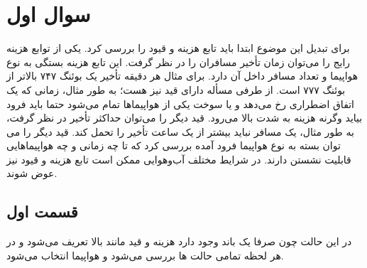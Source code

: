 \section{سوال اول}
برای تبدیل این موضوع ابتدا باید تابع هزینه و قیود را بررسی کرد. یکی از توابع هزینه رایج را می‌توان زمان تأخیر مسافران را در نظر گرفت.
این تابع هزینه بستگی به نوع هواپیما و تعداد مسافر داخل آن دارد. برای مثال هر دقیقه تأخیر یک بوئنگ ۷۴۷ بالاتر از بوئنگ ۷۷۷ است.
از طرفی مسأله دارای قید نیز هست؛ به طور مثال، زمانی که یک اتفاق اضطراری رخ می‌دهد و یا سوخت یکی از هواپیما‌ها تمام می‌شود حتما باید فرود بیاید وگرنه هزینه به شدت بالا می‌رود. قید دیگر را می‌توان حداکثر تأخیر در نظر گرفت، به طور مثال، یک مسافر نباید بیشتر از یک ساعت تأخیر را تحمل کند.
قید دیگر را می توان بسته به نوع هواپیما فرود آمده بررسی کرد که تا چه زمانی و چه هواپیما‌هایی قابلیت نشستن دارند.
 در شرایط مختلف آب‌و‌هوایی ممکن است تابع هزینه و قیود نیز عوض شوند.
\subsection{قسمت اول}
در این حالت چون صرفا یک باند وجود دارد هزینه و قید مانند بالا تعریف می‌شود و در هر لحظه تمامی حالت ها بررسی می‌شود و هواپیما انتخاب می‌شود.
